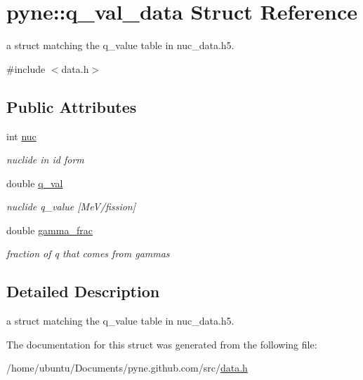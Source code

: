 \hypertarget{structpyne_1_1q__val__data}{}\section{pyne\+:\+:q\+\_\+val\+\_\+data Struct Reference}
\label{structpyne_1_1q__val__data}


a struct matching the q\+\_\+value table in nuc\+\_\+data.\+h5.  




{\ttfamily \#include $<$data.\+h$>$}

\subsection*{Public Attributes}
\begin{DoxyCompactItemize}
\item 
int \hyperlink{structpyne_1_1q__val__data_a39dbf1ad0347f0f68f09c94a9ff9157f}{nuc}\hypertarget{structpyne_1_1q__val__data_a39dbf1ad0347f0f68f09c94a9ff9157f}{}\label{structpyne_1_1q__val__data_a39dbf1ad0347f0f68f09c94a9ff9157f}

\begin{DoxyCompactList}\small\item\em nuclide in id form \end{DoxyCompactList}\item 
double \hyperlink{structpyne_1_1q__val__data_a8016ec428535fddb8cba5005511d4a8a}{q\+\_\+val}\hypertarget{structpyne_1_1q__val__data_a8016ec428535fddb8cba5005511d4a8a}{}\label{structpyne_1_1q__val__data_a8016ec428535fddb8cba5005511d4a8a}

\begin{DoxyCompactList}\small\item\em nuclide q\+\_\+value \mbox{[}Me\+V/fission\mbox{]} \end{DoxyCompactList}\item 
double \hyperlink{structpyne_1_1q__val__data_a5d47c172a924715d567a1b6119e20830}{gamma\+\_\+frac}\hypertarget{structpyne_1_1q__val__data_a5d47c172a924715d567a1b6119e20830}{}\label{structpyne_1_1q__val__data_a5d47c172a924715d567a1b6119e20830}

\begin{DoxyCompactList}\small\item\em fraction of q that comes from gammas \end{DoxyCompactList}\end{DoxyCompactItemize}


\subsection{Detailed Description}
a struct matching the q\+\_\+value table in nuc\+\_\+data.\+h5. 

The documentation for this struct was generated from the following file\+:\begin{DoxyCompactItemize}
\item 
/home/ubuntu/\+Documents/pyne.\+github.\+com/src/\hyperlink{data_8h}{data.\+h}\end{DoxyCompactItemize}
